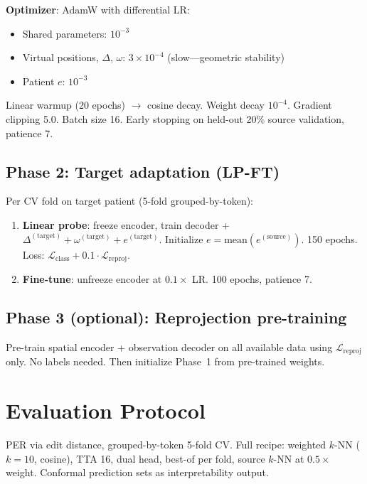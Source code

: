 \documentclass[11pt,letterpaper]{article}
\begin{document}
\textbf{Optimizer}: AdamW with differential LR:
\begin{itemize}[leftmargin=2em]
\item Shared parameters: $10^{-3}$
\item Virtual positions, $\Delta$, $\omega$: $3 \times 10^{-4}$ (slow---geometric stability)
\item Patient $e$: $10^{-3}$
\end{itemize}

Linear warmup (20 epochs) $\to$ cosine decay. Weight decay $10^{-4}$. Gradient clipping 5.0. Batch size 16. Early stopping on held-out 20\% source validation, patience 7.

\subsection{Phase 2: Target adaptation (LP-FT)}

Per CV fold on target patient (5-fold grouped-by-token):
\begin{enumerate}[leftmargin=2em]
\item \textbf{Linear probe}: freeze encoder, train decoder + $\Delta^{(\text{target})} + \omega^{(\text{target})} + e^{(\text{target})}$. Initialize $e = \text{mean}(e^{(\text{source})})$. 150 epochs. Loss: $\mathcal{L}_{\text{class}} + 0.1 \cdot \mathcal{L}_{\text{reproj}}$.
\item \textbf{Fine-tune}: unfreeze encoder at $0.1\times$ LR. 100 epochs, patience 7.
\end{enumerate}

\subsection{Phase 3 (optional): Reprojection pre-training}

Pre-train spatial encoder + observation decoder on all available data using $\mathcal{L}_{\text{reproj}}$ only. No labels needed. Then initialize Phase~1 from pre-trained weights.


\section{Evaluation Protocol}

PER via edit distance, grouped-by-token 5-fold CV. Full recipe: weighted $k$-NN ($k{=}10$, cosine), TTA 16, dual head, best-of per fold, source $k$-NN at $0.5\times$ weight. Conformal prediction sets as interpretability output.
\end{document}
